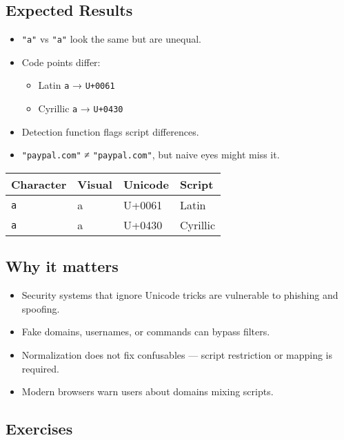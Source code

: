 \documentclass[
  letterpaper,
  DIV=11,
  numbers=noendperiod]{scrreprt}
\providecommand{\tightlist}{%
  \setlength{\itemsep}{0pt}\setlength{\parskip}{0pt}}
\begin{document}
\subsection{Expected Results}\label{expected-results-8}

\begin{itemize}
\item
  \texttt{"a"} vs \texttt{"а"} look the same but are unequal.
\item
  Code points differ:

  \begin{itemize}
  \tightlist
  \item
    Latin \texttt{a} → \texttt{U+0061}
  \item
    Cyrillic \texttt{а} → \texttt{U+0430}
  \end{itemize}
\item
  Detection function flags script differences.
\item
  \texttt{"paypal.com"} ≠ \texttt{"раураl.com"}, but naive eyes might
  miss it.
\end{itemize}

\begin{longtable}[]{@{}llll@{}}
\toprule\noalign{}
Character & Visual & Unicode & Script \\
\midrule\noalign{}
\endhead
\bottomrule\noalign{}
\endlastfoot
\texttt{a} & a & U+0061 & Latin \\
\texttt{а} & a & U+0430 & Cyrillic \\
\end{longtable}

\subsection{Why it matters}\label{why-it-matters-53}

\begin{itemize}
\tightlist
\item
  Security systems that ignore Unicode tricks are vulnerable to phishing
  and spoofing.
\item
  Fake domains, usernames, or commands can bypass filters.
\item
  Normalization does not fix confusables --- script restriction or
  mapping is required.
\item
  Modern browsers warn users about domains mixing scripts.
\end{itemize}

\subsection{Exercises}\label{exercises-52}
\end{document}
